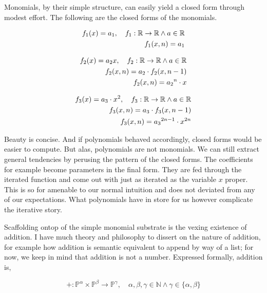 Monomials, by their simple structure, can easily yield a closed form through
modest effort. The following are the closed forms of the monomials.

\begin{align}
    f_1(x) = a_1, \quad f_1: \mathbb{R} \rightarrow \mathbb{R} \land a \in \mathbb{R} \notag \\
    f_1(x,n) = a_1
\end{align}

\begin{align}
    f_2(x) = a_2x, \quad f_2: \mathbb{R} \rightarrow \mathbb{R} \land a \in \mathbb{R} \notag \\
    f_2(x,n) = a_2 \cdot f_2(x,n-1) \notag                                                    \\
    f_2(x,n) = {a_2}^{n} \cdot x
\end{align}

\begin{align}
    f_3(x) = a_3 \cdot x^2, \quad f_3: \mathbb{R} \rightarrow \mathbb{R} \land a \in \mathbb{R} \notag \\
    f_3(x,n) = a_3 \cdot f_3(x,n-1) \notag                                                             \\
    f_3(x,n) = {a_3}^{2n - 1} \cdot x^{2n}
    \label{eq:closed-form-3}
\end{align}

Beauty is concise. And if polynomials behaved accordingly, closed forms would
be easier to compute. But alas, polynomials are not monomials. We can still
extract general tendencies by perusing the pattern of the closed forms. The
coefficients for example become parameters in the final form. They are fed
through the iterated function and come out with just as iterated as the
variable $x$ proper. This is so for amenable to our normal intuition and does
not deviated from any of our expectations. What polynomials have in store for
us however complicate the iterative story.

Scaffolding ontop of the simple monomial substrate is the vexing existence of
addition. I have much theory and philosophy to dissert on the nature of
addition, for example how addition is semantic equivalent to append by way of a
list; for now, we keep in mind that addition is not a number. Expressed
formally, addition is,

\begin{equation}
    +: \mathbb{P}^\alpha \times \mathbb{P}^\beta \rightarrow \mathbb{P}^\gamma, \quad \alpha, \beta, \gamma \in \mathbb{N} \land \gamma \in \{\alpha, \beta\}
\end{equation}

